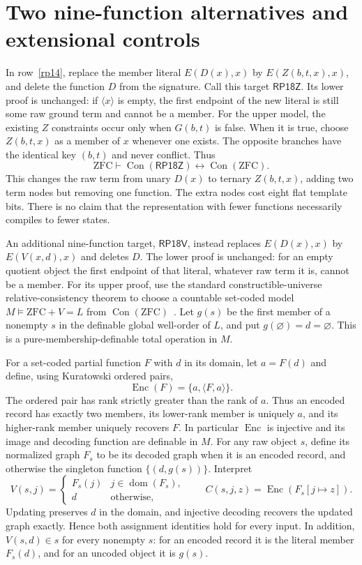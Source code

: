 \documentclass[11pt]{article}
\newcommand{\Con}{\operatorname{Con}}
\newcommand{\cl}[1]{\langle#1\rangle}
\newcommand{\RPZ}{\mathsf{RP18Z}}
\newcommand{\RPV}{\mathsf{RP18V}}
\begin{document}
\section{Two nine-function alternatives and extensional controls}

In row~\ref{rp14}, replace the member literal $E(D(x),x)$ by
$E(Z(b,t,x),x)$, and delete the function $D$ from the signature.
Call this target $\RPZ$. Its lower proof is unchanged: if $\cl x$
is empty, the first endpoint of the new literal is still some raw
ground term and cannot be a member. For the upper model, the existing
$Z$ constraints occur only when $G(b,t)$ is false. When it is true,
choose $Z(b,t,x)$ as a member of $x$ whenever one exists. The opposite
branches have the identical key $(b,t)$ and never conflict. Thus
\[
 \mathrm{ZFC}\vdash\Con(\RPZ)\longleftrightarrow\Con(\mathrm{ZFC}).
\]
This changes the raw term from unary $D(x)$ to ternary $Z(b,t,x)$,
adding two term nodes but removing one function. The extra nodes cost
eight flat template bits. There is no claim that the representation
with fewer functions necessarily compiles to fewer states.

An additional nine-function target, $\RPV$, instead replaces
$E(D(x),x)$ by $E(V(x,d),x)$ and deletes $D$. The lower proof is
unchanged: for an empty quotient object the first endpoint of that
literal, whatever raw term it is, cannot be a member. For its upper
proof, use the standard constructible-universe relative-consistency
theorem to choose a countable set-coded model
$M\models\mathrm{ZFC}+V=L$ from $\Con(\mathrm{ZFC})$~\cite{godel1938}.
Let $g(s)$ be the first member of a nonempty $s$ in the definable global
well-order of $L$, and put $g(\varnothing)=d=\varnothing$. This is a
pure-membership-definable total operation in $M$.

For a set-coded partial function $F$ with $d$ in its domain, let
$a=F(d)$ and define, using Kuratowski ordered pairs,
\[
 \operatorname{Enc}(F)=\{a,\langle F,a\rangle\}.
\]
The ordered pair has rank strictly greater than the rank of $a$.
Thus an encoded record has exactly two members, its lower-rank member
is uniquely $a$, and its higher-rank member uniquely recovers $F$.
In particular $\operatorname{Enc}$ is injective and its image and
decoding function are definable in $M$. For any raw object $s$, define
its normalized graph $F_s$ to be its decoded graph when it is an encoded
record, and otherwise the singleton function $\{(d,g(s))\}$.
Interpret
\[
 V(s,j)=\begin{cases}F_s(j)&j\in\operatorname{dom}(F_s),\\d&\text{otherwise},\end{cases}
 \qquad
 C(s,j,z)=\operatorname{Enc}(F_s[j\mapsto z]).
\]
Updating preserves $d$ in the domain, and injective decoding recovers
the updated graph exactly. Hence both assignment identities hold for
every input. In addition, $V(s,d)\in s$ for every nonempty $s$:
for an encoded record it is the literal member $F_s(d)$, and for an
uncoded object it is $g(s)$.
\end{document}
